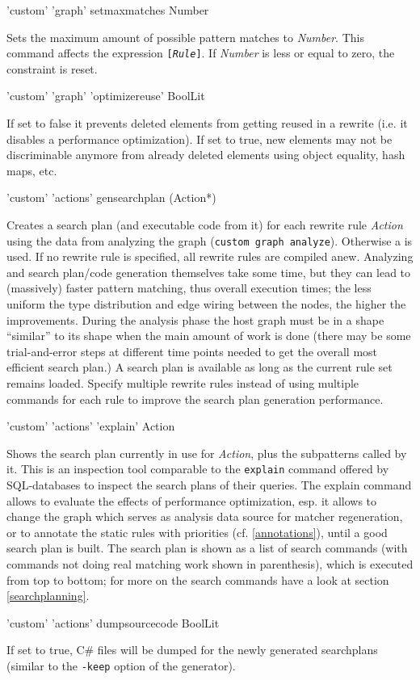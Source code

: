 \begin{rail}
  'custom' 'graph' setmaxmatches Number
\end{rail}
Sets the maximum amount of possible pattern matches to \emph{Number}.
This command affects the expression \texttt{[\emph{Rule}]}.
If \emph{Number} is less or equal to zero, the constraint is reset.

\begin{rail}
  'custom' 'graph' 'optimizereuse' BoolLit
\end{rail}
If set to false it prevents deleted elements from getting reused in a rewrite (i.e. it disables a performance optimization).
If set to true, new elements may not be discriminable anymore from already deleted elements using object equality, hash maps, etc.

\begin{rail}
  'custom' 'actions' gensearchplan (Action*)
\end{rail}
Creates a search plan (and executable code from it) for each rewrite rule \emph{Action} using the data from analyzing the graph (\texttt{custom graph analyze}).
Otherwise a  is used.
If no rewrite rule is specified, all rewrite rules are compiled anew.
Analyzing and search plan/code generation themselves take some time, but they can lead to (massively) faster pattern matching, thus overall execution times;
the less uniform the type distribution and edge wiring between the nodes, the higher the improvements.
During the analysis phase the host graph must be in a shape ``similar'' to its shape when the main amount of work is done
(there may be some trial-and-error steps at different time points needed to get the overall most efficient search plan.)
A search plan is available as long as the current rule set remains loaded.
Specify multiple rewrite rules instead of using multiple commands for each rule to improve the search plan generation performance.

\begin{rail}
  'custom' 'actions' 'explain' Action
\end{rail}
Shows the search plan currently in use for \emph{Action}, plus the subpatterns called by it.
This is an inspection tool comparable to the \texttt{explain} command offered by SQL-databases to inspect the search plans of their queries.
The explain command allows to evaluate the effects of performance optimization, esp. it allows to change the graph which serves as analysis data source for matcher regeneration, or to annotate the static rules with priorities (cf. \ref{annotations}), until a good search plan is built.
The search plan is shown as a list of search commands (with commands not doing real matching work shown in parenthesis), which is executed from top to bottom; for more on the search commands have a look at section \ref{searchplanning}.

\begin{rail}
  'custom' 'actions' dumpsourcecode BoolLit
\end{rail}
If set to true, C\# files will be dumped for the newly generated searchplans (similar to the \texttt{-keep} option of the generator).


